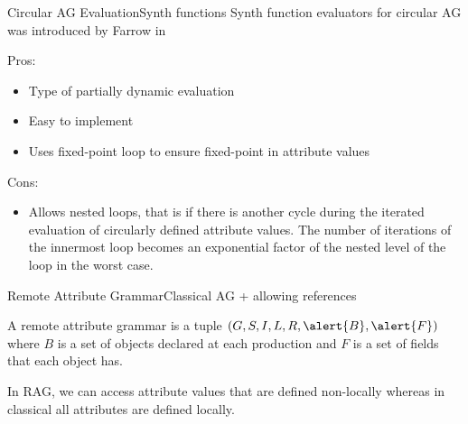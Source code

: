 \begin{frame}{Circular AG Evaluation}{Synth functions}
\alert{Synth function evaluators} for circular AG was introduced by Farrow in \cite{10.1145/13310.13320}

\newlinevspace

{ \footnotesize 

Pros:
\begin{itemize}
    \item Type of \alert{partially dynamic evaluation}
    \item Easy to implement
    \item Uses \alert{fixed-point loop} to ensure fixed-point in attribute values
\end{itemize}

Cons:
\begin{itemize}
    \item Allows \alert{nested loops}, that is if there is another cycle during the iterated evaluation of circularly defined attribute values. The number of iterations of the innermost loop becomes an \alert{exponential factor} of the nested level of the loop in the worst case.
\end{itemize} }

\end{frame}





\begin{frame}{Remote Attribute Grammar}{Classical AG + allowing references}
\begin{definition}
A remote attribute grammar is a tuple $(G,S,I,L,R,\alert{B},\alert{F})$ where \alert{$B$ is a set of objects} declared at each production and \alert{$F$ is a set of fields} that each object has.
\end{definition}

\newlinevspace

In RAG, we can access attribute values that are defined \alert{non-locally} whereas in classical all attributes are defined \alert{locally}.

\end{frame}

